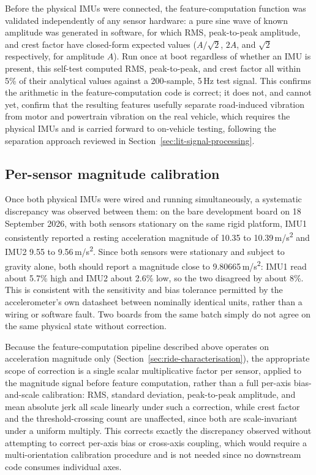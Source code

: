 Before the physical IMUs were connected, the feature-computation function was validated independently of any sensor hardware: a pure sine wave of known amplitude was generated in software, for which RMS, peak-to-peak amplitude, and crest factor have closed-form expected values ($A/\sqrt{2}$, $2A$, and $\sqrt{2}$ respectively, for amplitude $A$). Run once at boot regardless of whether an IMU is present, this self-test computed RMS, peak-to-peak, and crest factor all within 5\% of their analytical values against a 200-sample, 5\,Hz test signal. This confirms the arithmetic in the feature-computation code is correct; it does not, and cannot yet, confirm that the resulting features usefully separate road-induced vibration from motor and powertrain vibration on the real vehicle, which requires the physical IMUs and is carried forward to on-vehicle testing, following the separation approach reviewed in Section~\ref{sec:lit-signal-processing}.

\subsection{Per-sensor magnitude calibration}
\label{sec:imu-magnitude-calibration}

Once both physical IMUs were wired and running simultaneously, a systematic discrepancy was observed between them: on the bare development board on 18 September 2026, with both sensors stationary on the same rigid platform, IMU1 consistently reported a resting acceleration magnitude of 10.35 to 10.39\,m/s\textsuperscript{2} and IMU2 9.55 to 9.56\,m/s\textsuperscript{2}. Since both sensors were stationary and subject to gravity alone, both should report a magnitude close to 9.80665\,m/s\textsuperscript{2}: IMU1 read about 5.7\% high and IMU2 about 2.6\% low, so the two disagreed by about 8\%. This is consistent with the sensitivity and bias tolerance permitted by the accelerometer's own datasheet between nominally identical units, rather than a wiring or software fault. Two boards from the same batch simply do not agree on the same physical state without correction.

Because the feature-computation pipeline described above operates on acceleration magnitude only (Section~\ref{sec:ride-characterisation}), the appropriate scope of correction is a single scalar multiplicative factor per sensor, applied to the magnitude signal before feature computation, rather than a full per-axis bias-and-scale calibration: RMS, standard deviation, peak-to-peak amplitude, and mean absolute jerk all scale linearly under such a correction, while crest factor and the threshold-crossing count are unaffected, since both are scale-invariant under a uniform multiply. This corrects exactly the discrepancy observed without attempting to correct per-axis bias or cross-axis coupling, which would require a multi-orientation calibration procedure and is not needed since no downstream code consumes individual axes.

